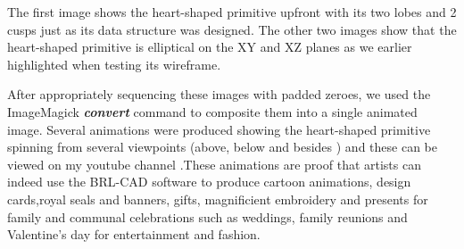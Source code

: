 The   first   image   shows   the   heart-­shaped   primitive   upfront   with   its   two   lobes   and  
2   cusps   just   as   its   data   structure   was   designed.   The   other   two   images   show  
that   the   heart­-shaped   primitive   is   elliptical   on   the   XY   and   XZ   planes   as   we  
earlier highlighted when testing its wireframe.

\hspace{30} After   appropriately   sequencing   these   images   with   padded   zeroes,   we  
used   the   ImageMagick   \textbf{\textit{convert}}   command   to   composite   them   into   a   single  
animated   image.   Several   animations   were   produced   showing   the   heart­-shaped  
primitive   spinning   from   several   viewpoints   (above, below and besides )   and  
these   can   be   viewed   on   my   youtube   channel \cite{43} \cite{44} .These   animations   are   proof   that  
artists   can   indeed   use   the   BRL-­CAD   software   to   produce   cartoon   animations,  
design   cards,royal   seals   and   banners,   gifts,   magnificient   embroidery   and  
presents   for   family   and   communal   celebrations   such   as   weddings,   family  
reunions and Valentine's day for entertainment and fashion.
\clearpage

